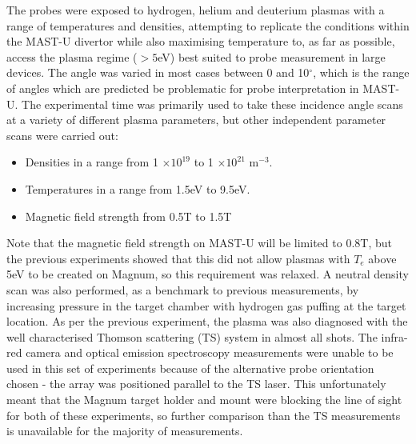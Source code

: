 \documentclass[a4paper, 12pt]{article} %
\begin{document}
	
	 
	The probes were exposed to hydrogen, helium and deuterium plasmas with a range of temperatures and densities, attempting to replicate the conditions within the MAST-U divertor while also maximising temperature to, as far as possible, access the plasma regime ($>5$eV) best suited to probe measurement in large devices.
	The angle was varied in most cases between 0 and 10$^{\circ}$, which is the range of angles which are predicted be problematic for probe interpretation in MAST-U.
	The experimental time was primarily used to take these incidence angle scans at a variety of different plasma parameters, but other independent parameter scans were carried out:
	\begin{itemize}
	    \item Densities in a range from 1 $\times 10^{19}$ to 1 $\times 10^{21}$ m$^{-3}$. 
	    \item Temperatures in a range from 1.5eV to 9.5eV.
	    \item Magnetic field strength from 0.5T to 1.5T
	\end{itemize}
	Note that the magnetic field strength on MAST-U will be limited to 0.8T, but the previous experiments showed that this did not allow plasmas with $T_e$ above 5eV to be created on Magnum, so this requirement was relaxed.
	A neutral density scan was also performed, as a benchmark to previous measurements, by increasing pressure in the target chamber with hydrogen gas puffing at the target location.
	As per the previous experiment, the plasma was also diagnosed with the well characterised \cite{} Thomson scattering (TS) system in almost all shots.
	The infra-red camera and optical emission spectroscopy measurements were unable to be used in this set of experiments because of the alternative probe orientation chosen - the array was positioned parallel to the TS laser. 
	This unfortunately meant that the Magnum target holder and mount were blocking the line of sight for both of these experiments, so further comparison than the TS measurements is unavailable for the majority of measurements.
	
\end{document}

